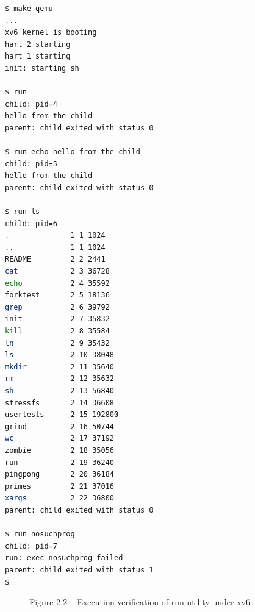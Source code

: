 \documentclass[12pt,a4paper]{report}
\numberwithin{equation}{chapter}
\numberwithin{figure}{chapter}
\numberwithin{table}{chapter}
\begin{document}
\begin{lstlisting}[language=bash]
$ make qemu
...
xv6 kernel is booting
hart 2 starting
hart 1 starting
init: starting sh

$ run
child: pid=4
hello from the child
parent: child exited with status 0

$ run echo hello from the child
child: pid=5
hello from the child
parent: child exited with status 0

$ run ls
child: pid=6
.              1 1 1024
..             1 1 1024
README         2 2 2441
cat            2 3 36728
echo           2 4 35592
forktest       2 5 18136
grep           2 6 39792
init           2 7 35832
kill           2 8 35584
ln             2 9 35432
ls             2 10 38048
mkdir          2 11 35640
rm             2 12 35632
sh             2 13 56840
stressfs       2 14 36608
usertests      2 15 192800
grind          2 16 50744
wc             2 17 37192
zombie         2 18 35056
run            2 19 36240
pingpong       2 20 36184
primes         2 21 37016
xargs          2 22 36800
parent: child exited with status 0

$ run nosuchprog
child: pid=7
run: exec nosuchprog failed
parent: child exited with status 1
$ 
\end{lstlisting}

\begin{figure}[H]
\centering
\caption{Figure 2.2 -- Execution verification of run utility under xv6}
\end{figure}
\end{document}
